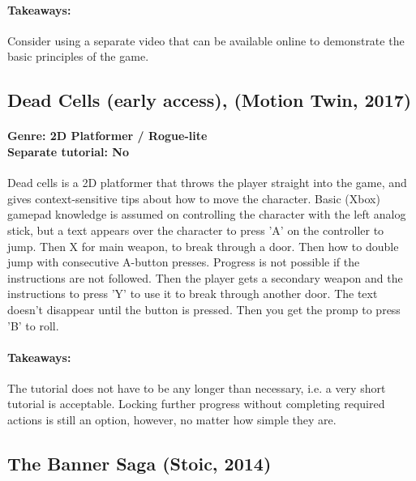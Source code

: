 \paragraph{Takeaways:}
Consider using a separate video that can be available online to demonstrate the basic principles of the game.

\subsection{Dead Cells (early access), (Motion Twin, 2017)}
\paragraph{Genre: 2D Platformer / Rogue-lite \\ Separate tutorial: No \\}
Dead cells is a 2D platformer that throws the player straight into the game, and gives context-sensitive tips about how to move the character. Basic (Xbox) gamepad knowledge is assumed on controlling the character with the left analog stick, but a text appears over the character to press 'A' on the controller to jump. Then X for main weapon, to break through a door. Then how to double jump with consecutive A-button presses. Progress is not possible if the instructions are not followed. Then the player gets a secondary weapon and the instructions to press 'Y' to use it to break through another door. The text doesn't disappear until the button is pressed. Then you get the promp to press 'B' to roll.
\paragraph{Takeaways:}
The tutorial does not have to be any longer than necessary, i.e. a very short tutorial is acceptable. Locking further progress without completing required actions is still an option, however, no matter how simple they are.

\subsection{The Banner Saga (Stoic, 2014)}
